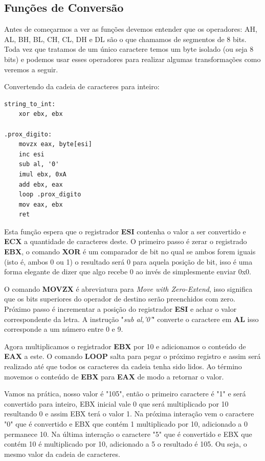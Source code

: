 \subsection{Funções de Conversão}

Antes de começarmos a ver as funções devemos entender que os operadores: AH, AL, BH, BL, CH, CL, DH e DL são o que chamamos de segmentos de 8 bits. Toda vez que tratamos de um único caractere temos um byte isolado (ou seja 8 bits) e podemos usar esses operadores para realizar algumas transformações como veremos a seguir.

Convertendo da cadeia de caracteres para inteiro:
\begin{lstlisting}[]
string_to_int:
	xor ebx, ebx

.prox_digito:
	movzx eax, byte[esi]
	inc esi
	sub al, '0'
	imul ebx, 0xA
	add ebx, eax
	loop .prox_digito
	mov eax, ebx
	ret
\end{lstlisting}

Esta função espera que o registrador \textbf{ESI} contenha o valor a ser convertido e \textbf{ECX} a quantidade de caracteres deste. O primeiro passo é zerar o registrado \textbf{EBX}, o comando \textbf{XOR} é um comparador de bit no qual se ambos forem iguais (isto é, ambos 0 ou 1) o resultado será 0 para aquela posição de bit, isso é uma forma elegante de dizer que algo recebe 0 ao invés de simplesmente enviar 0x0.

O comando \textbf{MOVZX} é abreviatura para \textit{Move with Zero-Extend}, isso significa que os bits superiores do operador de destino serão preenchidos com zero. Próximo passo é incrementar a posição do registrador \textbf{ESI} e achar o valor correspondente da letra. A instrução "\textit{sub al,'0'}" converte o caractere em \textbf{AL} isso corresponde a um número entre 0 e 9.

Agora multiplicamos o registrador \textbf{EBX} por 10 e adicionamos o conteúdo de \textbf{EAX} a este. O comando \textbf{LOOP} salta para pegar o próximo registro e assim será realizado até que todos os caracteres da cadeia tenha sido lidos. Ao término movemos o conteúdo de \textbf{EBX} para \textbf{EAX} de modo a retornar o valor.

Vamos na prática, nosso valor é "105", então o primeiro caractere é "1" e será convertido para inteiro, EBX inicial vale 0 que será multiplicado por 10 resultando 0 e assim EBX terá o valor 1. Na próxima interação vem o caractere "0" que é convertido e EBX que contém 1 multiplicado por 10, adicionado a 0 permanece 10. Na última interação o caractere "5" que é convertido e EBX que contém 10 é multiplicado por 10, adicionado a 5 o resultado é 105. Ou seja, o mesmo valor da cadeia de caracteres.

